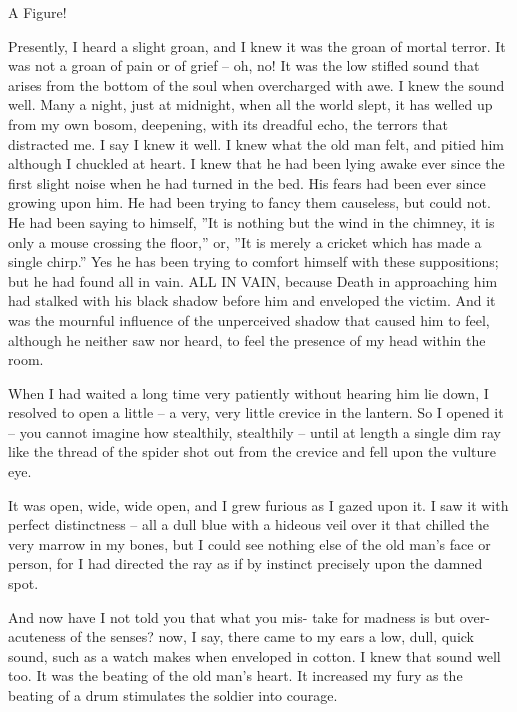 \documentclass[11pt]{article}
\begin{document}
\begin{floatingfigure}[l]{50mm}
\begin{center}
\Large A Figure!
\end{center}
\caption{The \texttt{floatingfigure} environment
with \textit{width} set to \texttt{50mm}  and the
\texttt{l} \textit{option}.}
\end{floatingfigure}
Presently, I heard a slight groan, and I knew it
was the groan of mortal terror. It was not a groan of
pain or of grief -- oh, no! It was the low stifled sound
that arises from the bottom of the soul when
overcharged with awe. I knew the sound well. Many
a night, just at midnight, when all the world slept,
it has welled up from my own bosom, deepening,
with its dreadful echo, the terrors that distracted
me. I say I knew it well. I knew what the old
man felt, and pitied him although I chuckled at
heart. I knew that he had been lying awake ever
since the first slight noise when he had turned in
the bed. His fears had been ever since growing
upon him. He had been trying to fancy them
causeless, but could not. He had been saying to
himself, ''It is nothing but the wind in the chimney,
it is only a mouse crossing the floor,'' or, ''It is merely
a cricket which has made a single chirp.'' Yes he
has been trying to comfort himself with these
suppositions; but he had found all in vain. ALL IN VAIN,
because Death in approaching him had stalked with
his black shadow before him and enveloped the
victim. And it was the mournful influence of the
unperceived shadow that caused him to feel, although
he neither saw nor heard, to feel the presence
of my head within the room.

When I had waited a long time very patiently
without hearing him lie down, I resolved to open
a little -- a very, very little crevice in the lantern.
So I opened it -- you cannot imagine how stealthily,
stealthily -- until at length a single dim ray like the
thread of the spider shot out from the crevice and
fell upon the vulture eye.

It was open, wide, wide open, and I grew furious
as I gazed upon it. I saw it with perfect distinctness
-- all a dull blue with a hideous veil over it that
chilled the very marrow in my bones, but I could
see nothing else of the old man's face or person, for
I had directed the ray as if by instinct precisely upon
the damned spot.

And now have I not told you that what you mis-
take for madness is but over-acuteness of the senses?
now, I say, there came to my ears a low, dull, quick
sound, such as a watch makes when enveloped in
cotton. I knew that sound well too. It was the
beating of the old man's heart. It increased my fury
as the beating of a drum stimulates the soldier into
courage.
\end{document}
